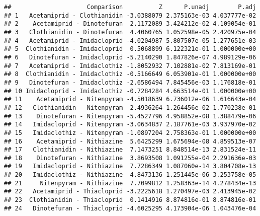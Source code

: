 \documentclass[]{article}
\newenvironment{Shaded}{\begin{snugshade}}{\end{snugshade}}
\newcommand{\KeywordTok}[1]{\textcolor[rgb]{0.13,0.29,0.53}{\textbf{#1}}}
\newcommand{\CommentTok}[1]{\textcolor[rgb]{0.56,0.35,0.01}{\textit{#1}}}
\newcommand{\OperatorTok}[1]{\textcolor[rgb]{0.81,0.36,0.00}{\textbf{#1}}}
\newcommand{\NormalTok}[1]{#1}
\begin{document}
\begin{Shaded}
\end{Shaded}

\begin{verbatim}
##                     Comparison          Z      P.unadj        P.adj
## 1   Acetamiprid - Clothianidin -3.0388079 2.375163e-03 4.037777e-02
## 2    Acetamiprid - Dinotefuran  2.1172089 3.424212e-02 4.109054e-01
## 3   Clothianidin - Dinotefuran  4.4060765 1.052598e-05 2.420975e-04
## 4   Acetamiprid - Imidacloprid -4.0204987 5.807507e-05 1.277651e-03
## 5  Clothianidin - Imidacloprid  0.5068899 6.122321e-01 1.000000e+00
## 6   Dinotefuran - Imidacloprid -5.2140290 1.847826e-07 4.989129e-06
## 7   Acetamiprid - Imidaclothiz -1.8052932 7.102881e-02 7.813169e-01
## 8  Clothianidin - Imidaclothiz -0.5166649 6.053901e-01 1.000000e+00
## 9   Dinotefuran - Imidaclothiz -2.6586494 7.845456e-03 1.176818e-01
## 10 Imidacloprid - Imidaclothiz -0.7284284 4.663514e-01 1.000000e+00
## 11    Acetamiprid - Nitenpyram -4.5018639 6.736012e-06 1.616643e-04
## 12   Clothianidin - Nitenpyram -2.4936264 1.264456e-02 1.770238e-01
## 13    Dinotefuran - Nitenpyram -5.4527796 4.958852e-08 1.388479e-06
## 14   Imidacloprid - Nitenpyram -3.0634837 2.187761e-03 3.937970e-02
## 15   Imidaclothiz - Nitenpyram -1.0897204 2.758363e-01 1.000000e+00
## 16    Acetamiprid - Nithiazine  5.6425299 1.675694e-08 4.859513e-07
## 17   Clothianidin - Nithiazine  7.1473251 8.848514e-13 2.831524e-11
## 18    Dinotefuran - Nithiazine  3.8693508 1.091255e-04 2.291636e-03
## 19   Imidacloprid - Nithiazine  7.7286349 1.087060e-14 3.804708e-13
## 20   Imidaclothiz - Nithiazine  4.8473136 1.251445e-06 3.253758e-05
## 21     Nitenpyram - Nithiazine  7.7099812 1.258363e-14 4.278434e-13
## 22   Acetamiprid - Thiacloprid -3.2225618 1.270497e-03 2.413945e-02
## 23  Clothianidin - Thiacloprid  0.1414916 8.874816e-01 8.874816e-01
## 24   Dinotefuran - Thiacloprid -4.6025295 4.173904e-06 1.043476e-04

\end{verbatim}
\end{document}
